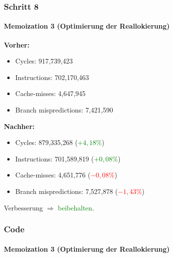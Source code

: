 \documentclass{beamer}
\newcommand{\success}[1]{\textcolor{green}{#1}}
\newcommand{\fail}[1]{\textcolor{red}{#1}}
\begin{document}
  \begin{frame}
  	\frametitle{Schritt 8}
  	\framesubtitle{Memoization 3 (Optimierung der Reallokierung)}
  	\textbf{Vorher:}
		\begin{itemize}
			\item Cycles: 917,739,423\\
			\item Instructions: 702,170,463\\
			\item Cache-misses: 4,647,945\\
			\item Branch mispredictions: 7,421,590\\
		\end{itemize}	
				
		\textbf{Nachher:}
		\begin{itemize}
			\item Cycles: 879,335,268 (\success{$+ 4,18\%$})\\
			\item Instructions: 701,589,819 (\success{$+ 0,08\%$})\\
			\item Cache-misses: 4,651,776 (\fail{$- 0,08\%$})\\
			\item Branch mispredictions: 7,527,878 (\fail{$- 1,43\%$})\\
		\end{itemize}	
		Verbesserung $\Rightarrow$ \success{beibehalten}.
  \end{frame} 
  
  \begin{frame}
  	\frametitle{Code}
  	\framesubtitle{Memoization 3 (Optimierung der Reallokierung)}
  	\sMemoThree
  \end{frame}  
      
\end{document}
